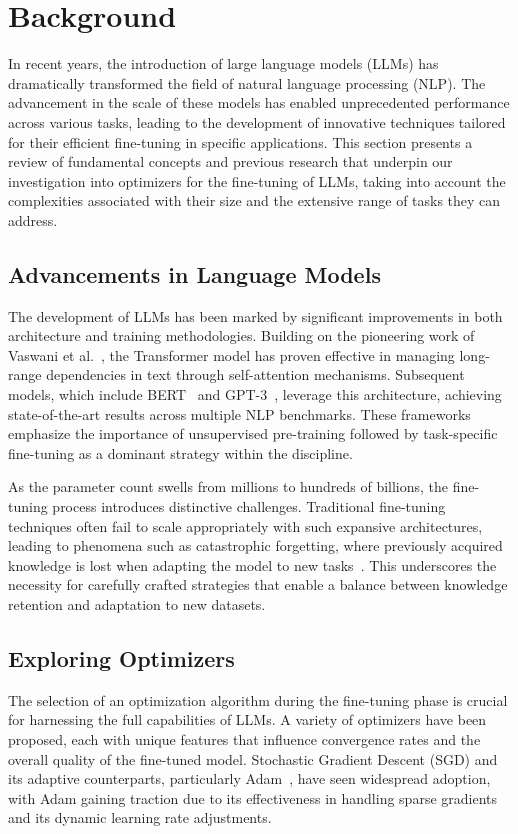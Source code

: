 \documentclass{article} %
\begin{document}
\section{Background}
\label{sec:background}
In recent years, the introduction of large language models (LLMs) has dramatically transformed the field of natural language processing (NLP). The advancement in the scale of these models has enabled unprecedented performance across various tasks, leading to the development of innovative techniques tailored for their efficient fine-tuning in specific applications. This section presents a review of fundamental concepts and previous research that underpin our investigation into optimizers for the fine-tuning of LLMs, taking into account the complexities associated with their size and the extensive range of tasks they can address.

\subsection{Advancements in Language Models}
The development of LLMs has been marked by significant improvements in both architecture and training methodologies. Building on the pioneering work of Vaswani et al.~\cite{vaswani2017attention}, the Transformer model has proven effective in managing long-range dependencies in text through self-attention mechanisms. Subsequent models, which include BERT~\cite{devlin2018bert} and GPT-3~\cite{brown2020language}, leverage this architecture, achieving state-of-the-art results across multiple NLP benchmarks. These frameworks emphasize the importance of unsupervised pre-training followed by task-specific fine-tuning as a dominant strategy within the discipline.

As the parameter count swells from millions to hundreds of billions, the fine-tuning process introduces distinctive challenges. Traditional fine-tuning techniques often fail to scale appropriately with such expansive architectures, leading to phenomena such as catastrophic forgetting, where previously acquired knowledge is lost when adapting the model to new tasks~\cite{zhang2019fine}. This underscores the necessity for carefully crafted strategies that enable a balance between knowledge retention and adaptation to new datasets. 

\subsection{Exploring Optimizers}
The selection of an optimization algorithm during the fine-tuning phase is crucial for harnessing the full capabilities of LLMs. A variety of optimizers have been proposed, each with unique features that influence convergence rates and the overall quality of the fine-tuned model. Stochastic Gradient Descent (SGD) and its adaptive counterparts, particularly Adam~\cite{kingma2014adam}, have seen widespread adoption, with Adam gaining traction due to its effectiveness in handling sparse gradients and its dynamic learning rate adjustments. 
\end{document}
